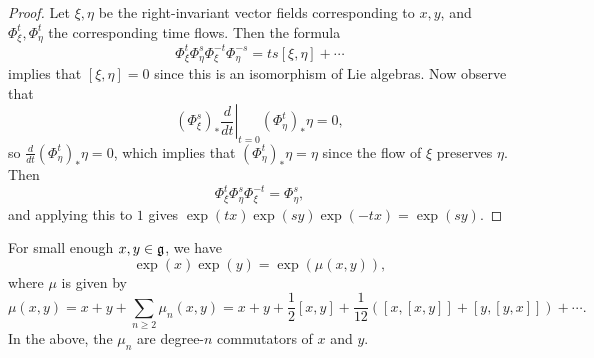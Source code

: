 \begin{proof}
  Let $\xi, \eta$ be the right-invariant
  vector fields corresponding to $x, y$,
  and $\Phi^t_\xi, \Phi^t_\eta$
  the corresponding time flows.
  Then the formula
  \[
    \Phi^t_{\xi}
    \Phi^s_{\eta}
    \Phi^{-t}_{\xi}
    \Phi^{-s}_{\eta}
    = ts[\xi, \eta] + \cdots
  \]
  implies that $[\xi, \eta] = 0$
  since this is an isomorphism of
  Lie algebras. Now observe that
  \[
    (\Phi^s_{\xi})_*
    \left.\frac{d}{dt}\right|_{t = 0}
    (\Phi^t_{\eta})_* \eta = 0,
  \]
  so $\frac{d}{dt} (\Phi^t_{\eta})_* \eta = 0$, which
  implies that
  $(\Phi^t_{\eta})_* \eta = \eta$ since
  the flow of $\xi$ preserves $\eta$.
  Then
  \[
    \Phi^t_{\xi} \Phi^s_{\eta}
    \Phi^{-t}_{\xi}
    = \Phi^s_{\eta},
  \]
  and applying this to $1$ gives
  $\exp(tx) \exp(sy) \exp(-tx) = \exp(sy)$.
\end{proof}

\begin{theorem}
  For small enough $x, y \in \mathfrak{g}$, we have
  \[
    \exp(x) \exp(y)
    = \exp(\mu(x, y)),
  \]
  where $\mu$ is given by
  \[
    \mu(x, y) = x + y + \sum_{n \ge 2} \mu_n(x, y)
    = x + y + \frac{1}{2} [x, y]
    + \frac{1}{12} ([x, [x, y]] + [y, [y, x]])
    + \cdots.
  \]
  In the above, the $\mu_n$ are
  degree-$n$ commutators
  of $x$ and $y$.
\end{theorem}
